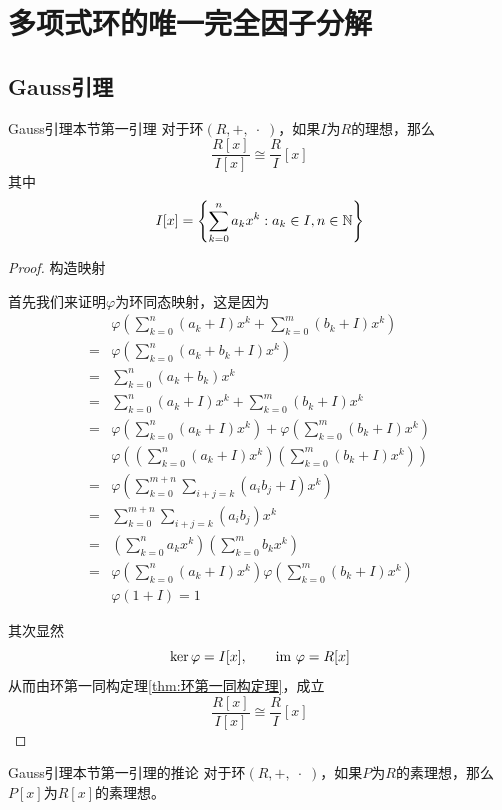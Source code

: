 \section{多项式环的唯一完全因子分解}

\subsection{Gauss引理}

\begin{lemma}{}{Gauss引理本节第一引理}
	对于环$(R,+,\;\cdot \;)$，如果$I$为$R$的理想，那么%
	$$
	\frac{R[x]}{I[x]}\cong\frac{R}{I}[x]
	$$
	其中%
	$$
	I[x]=\left\{ \sum_{k=0}^{n}a_kx^k:a_k\in I,n\in\mathbb{N} \right\}
	$$
\end{lemma}

\begin{proof}
	构造映射
	
	首先我们来证明$\varphi$为环同态映射，这是因为
	\begin{align*}
		& \varphi\left(\sum_{k=0}^{n}(a_k+I)x^k+\sum_{k=0}^{m}(b_k+I)x^k\right)\\
		= & \varphi\left(\sum_{k=0}^{n}(a_k+b_k+I)x^k\right)\\
		= & \sum_{k=0}^{n}(a_k+b_k)x^k\\
		= & \sum_{k=0}^{n}(a_k+I)x^k+\sum_{k=0}^{m}(b_k+I)x^k\\
		= & \varphi\left(\sum_{k=0}^{n}(a_k+I)x^k\right)+\varphi\left(\sum_{k=0}^{m}(b_k+I)x^k\right)\\
		& \varphi\left(\left(\sum_{k=0}^{n}(a_k+I)x^k\right)\left(\sum_{k=0}^{m}(b_k+I)x^k\right)\right)\\
		= & \varphi\left(\sum_{k=0}^{m+n}\sum_{i+j=k}(a_ib_j+I)x^k\right)\\
		= & \sum_{k=0}^{m+n}\sum_{i+j=k}(a_ib_j)x^k\\
		= & \left(\sum_{k=0}^{n}a_kx^k\right)\left(\sum_{k=0}^{m}b_kx^k\right)\\
		= & \varphi\left(\sum_{k=0}^{n}(a_k+I)x^k\right)\varphi\left(\sum_{k=0}^{m}(b_k+I)x^k\right)\\
		& \varphi(1+I)=1
	\end{align*}

	其次显然%
	$$
	\ker\varphi=I[x],\qquad 
	\text{im }\varphi=R[x]
	$$
	从而由环第一同构定理\ref{thm:环第一同构定理}，成立
	$$
	\frac{R[x]}{I[x]}\cong\frac{R}{I}[x]
	$$
\end{proof}

\begin{corollary}{}{Gauss引理本节第一引理的推论}
	对于环$(R,+,\;\cdot \;)$，如果$P$为$R$的素理想，那么$P[x]$为$R[x]$的素理想。
\end{corollary}

